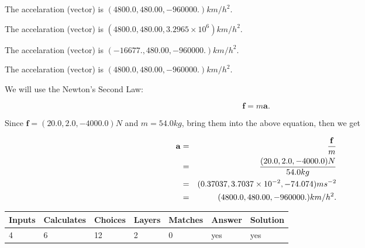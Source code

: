 \documentclass[12pt]{article}
\begin{document}
 
The accelaration (vector) is
$(
4800.0,
480.00 ,
-960000.
)km/h^2.
$
 
 
The accelaration (vector) is
$(
4800.0,
480.00 ,
3.2965 \times 10^{6}
)km/h^2.
$
 
 
The accelaration (vector) is
$(
-16677.,
480.00 ,
-960000.
)km/h^2.
$
 
 
\noindent{}
 
 
The accelaration (vector) is
$(
4800.0,
480.00 ,
-960000.
)km/h^2.
$
 
 
\noindent{}
 
 
 
 
 
 
\noindent{}
 
 

We will use the Newton's Second Law:
 
\[
\mathbf{f}=m\mathbf{a}.
\]
 
Since $\mathbf{f}=( %
20.0,  %
2.0,  %
-4000.0 )N$
and $m= %
54.0 kg$, bring them into the above equation, then we get
 
\begin{eqnarray*}
\mathbf{a}&=&\frac{\mathbf{f}}m  \\
&=&\frac{(
20.0 ,
2.0 ,
-4000.0 )N
}{ %
54.0 kg}  \\
&=&(
0.37037 ,
3.7037 \times 10^{-2},
-74.074
)ms^{-2} \\
&=&(
4800.0 ,
480.00 ,
-960000.
)km/h^2.
\end{eqnarray*}
 
 
 
\noindent{}
 
 

 
 
\vspace{0.3in}
   
   
   
   
\noindent\begin{tabular}{|l|l|l|l|l|l|l|}
 \hline
Inputs & Calculates & Choices & Layers & Matches & Answer & Solution \\ \hline
           4  & 
           6  & 
          12
  & 
           2  & 
           0  & 
  yes & 
  yes 
  \\ \hline
 \end{tabular}
   
\end{document}
